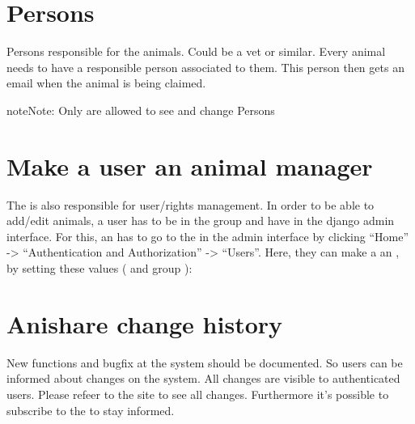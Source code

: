 \documentclass[letterpaper,10pt,openany,oneside,english]{sphinxmanual}
\begin{document}
\section{Persons}
\label{\detokenize{index:persons}}
Persons responsible for the animals. Could be a vet or similar.
Every animal needs to have a responsible person associated to them. This person then gets
an email when the animal is being claimed.

\noindent{}

\begin{sphinxadmonition}{note}{Note:}
Only  are allowed to see and change Persons
\end{sphinxadmonition}


\section{Make a user an animal manager}
\label{\detokenize{index:make-a-user-an-animal-manager}}
The  is also responsible for user/rights management.
In order to be able to add/edit animals, a user has to be in the group  and have
 in the django admin interface. For this, an  has to go to the  in the admin interface by clicking “Home” -\textgreater{} “Authentication and
Authorization” -\textgreater{} “Users”. Here, they can make a  an , by setting these values (
and group ):

\noindent{}


\section{Anishare change history}
\label{\detokenize{index:anishare-change-history}}
New functions and bugfix at the system should be documented. So users can be informed about changes on the system.
All changes are visible to authenticated users. Please refeer to the site  to see all changes. Furthermore it’s possible to subscribe to
the  to stay informed.



\renewcommand{\indexname}{Index}
\printindex
\end{document}
